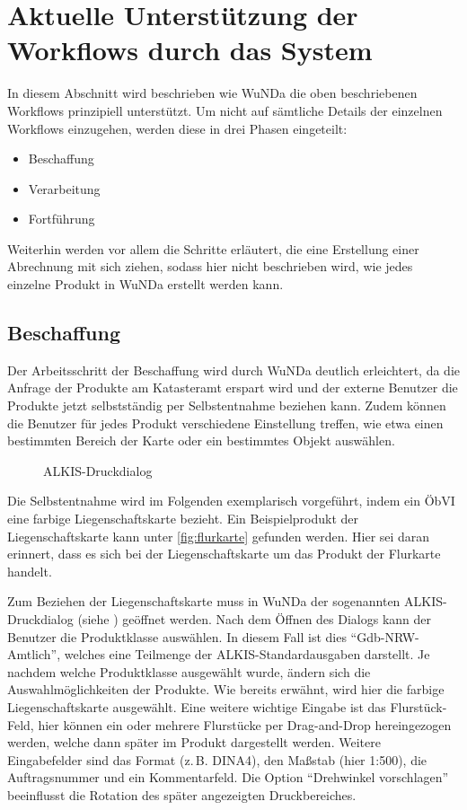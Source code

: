\section{Aktuelle Unterstützung der Workflows durch das System}

In diesem Abschnitt wird beschrieben wie \ac{WuNDa} die oben beschriebenen Workflows prinzipiell unterstützt.
Um nicht auf sämtliche Details der einzelnen Workflows einzugehen, werden diese in drei Phasen eingeteilt:
\begin{itemize}
 \item Beschaffung
 \item Verarbeitung
 \item Fortführung
\end{itemize}
Weiterhin werden vor allem die Schritte erläutert, die eine Erstellung einer Abrechnung mit sich ziehen, sodass hier nicht beschrieben wird, wie jedes einzelne Produkt in \ac{WuNDa} erstellt werden kann.

\subsection{Beschaffung} \label{subsec:beschaffung}
Der Arbeitsschritt der Beschaffung wird durch \ac{WuNDa} deutlich erleichtert, da die Anfrage der Produkte am Katasteramt erspart wird und der externe Benutzer  die Produkte jetzt selbstständig per Selbstentnahme beziehen kann. Zudem können die Benutzer für jedes Produkt verschiedene Einstellung treffen, wie etwa einen bestimmten Bereich der Karte oder ein bestimmtes Objekt auswählen.

\begin{figure}[htb]
	\centering
	\caption{ALKIS-Druckdialog}
	\label{fig:alkis-druck}
\end{figure}

Die Selbstentnahme wird im Folgenden exemplarisch vorgeführt, indem ein \ac{ÖbVI} eine farbige Liegenschaftskarte bezieht. Ein Beispielprodukt der Liegenschaftskarte kann unter \ref{fig:flurkarte} gefunden werden. 
Hier sei daran erinnert, dass es sich bei der Liegenschaftskarte um das  Produkt der Flurkarte handelt. 

Zum Beziehen der Liegenschaftskarte muss in \ac{WuNDa} der sogenannten ALKIS-Druckdialog (siehe ) geöffnet werden.
Nach dem Öffnen des Dialogs kann der Benutzer die Produktklasse auswählen. In diesem Fall ist dies "`Gdb-NRW-Amtlich"', welches eine Teilmenge der ALKIS-Standardausgaben darstellt. 
Je nachdem welche Produktklasse ausgewählt wurde, ändern sich die Auswahlmöglichkeiten der Produkte.
Wie bereits erwähnt, wird hier die farbige Liegenschaftskarte ausgewählt.
Eine weitere wichtige Eingabe ist das Flurstück-Feld, hier können ein oder mehrere Flurstücke per Drag-and-Drop hereingezogen werden, welche dann später im Produkt dargestellt werden.
Weitere Eingabefelder sind das Format (z.\,B. DINA4), den  Maßstab (hier 1:500), die Auftragsnummer und ein Kommentarfeld. Die Option "`Drehwinkel vorschlagen"' beeinflusst die Rotation des später angezeigten Druckbereiches.


